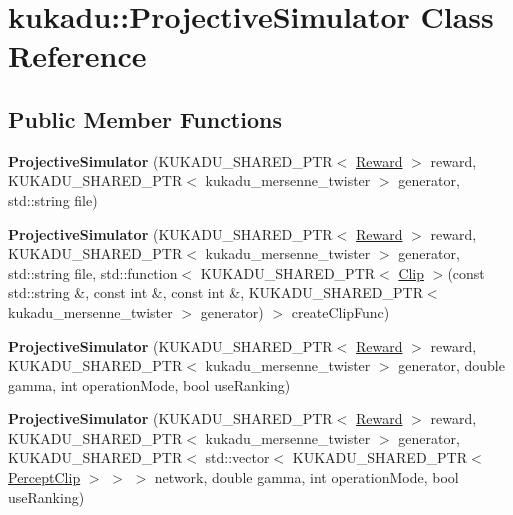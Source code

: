 \hypertarget{classkukadu_1_1ProjectiveSimulator}{}\section{kukadu\+:\+:Projective\+Simulator Class Reference}
\label{classkukadu_1_1ProjectiveSimulator}
\subsection*{Public Member Functions}
\begin{DoxyCompactItemize}
\item 
{\bfseries Projective\+Simulator} (K\+U\+K\+A\+D\+U\+\_\+\+S\+H\+A\+R\+E\+D\+\_\+\+P\+TR$<$ \hyperlink{classkukadu_1_1Reward}{Reward} $>$ reward, K\+U\+K\+A\+D\+U\+\_\+\+S\+H\+A\+R\+E\+D\+\_\+\+P\+TR$<$ kukadu\+\_\+mersenne\+\_\+twister $>$ generator, std\+::string file)\hypertarget{classkukadu_1_1ProjectiveSimulator_a5ab38c1c4ddc848435ef268154a68964}{}\label{classkukadu_1_1ProjectiveSimulator_a5ab38c1c4ddc848435ef268154a68964}

\item 
{\bfseries Projective\+Simulator} (K\+U\+K\+A\+D\+U\+\_\+\+S\+H\+A\+R\+E\+D\+\_\+\+P\+TR$<$ \hyperlink{classkukadu_1_1Reward}{Reward} $>$ reward, K\+U\+K\+A\+D\+U\+\_\+\+S\+H\+A\+R\+E\+D\+\_\+\+P\+TR$<$ kukadu\+\_\+mersenne\+\_\+twister $>$ generator, std\+::string file, std\+::function$<$ K\+U\+K\+A\+D\+U\+\_\+\+S\+H\+A\+R\+E\+D\+\_\+\+P\+TR$<$ \hyperlink{classkukadu_1_1Clip}{Clip} $>$(const std\+::string \&, const int \&, const int \&, K\+U\+K\+A\+D\+U\+\_\+\+S\+H\+A\+R\+E\+D\+\_\+\+P\+TR$<$ kukadu\+\_\+mersenne\+\_\+twister $>$ generator) $>$ create\+Clip\+Func)\hypertarget{classkukadu_1_1ProjectiveSimulator_af2a9a8b46a43939fc551c9a6d2ebac2d}{}\label{classkukadu_1_1ProjectiveSimulator_af2a9a8b46a43939fc551c9a6d2ebac2d}

\item 
{\bfseries Projective\+Simulator} (K\+U\+K\+A\+D\+U\+\_\+\+S\+H\+A\+R\+E\+D\+\_\+\+P\+TR$<$ \hyperlink{classkukadu_1_1Reward}{Reward} $>$ reward, K\+U\+K\+A\+D\+U\+\_\+\+S\+H\+A\+R\+E\+D\+\_\+\+P\+TR$<$ kukadu\+\_\+mersenne\+\_\+twister $>$ generator, double gamma, int operation\+Mode, bool use\+Ranking)\hypertarget{classkukadu_1_1ProjectiveSimulator_aa7f5285814bf9a4a630a8b3e62483cd3}{}\label{classkukadu_1_1ProjectiveSimulator_aa7f5285814bf9a4a630a8b3e62483cd3}

\item 
{\bfseries Projective\+Simulator} (K\+U\+K\+A\+D\+U\+\_\+\+S\+H\+A\+R\+E\+D\+\_\+\+P\+TR$<$ \hyperlink{classkukadu_1_1Reward}{Reward} $>$ reward, K\+U\+K\+A\+D\+U\+\_\+\+S\+H\+A\+R\+E\+D\+\_\+\+P\+TR$<$ kukadu\+\_\+mersenne\+\_\+twister $>$ generator, K\+U\+K\+A\+D\+U\+\_\+\+S\+H\+A\+R\+E\+D\+\_\+\+P\+TR$<$ std\+::vector$<$ K\+U\+K\+A\+D\+U\+\_\+\+S\+H\+A\+R\+E\+D\+\_\+\+P\+TR$<$ \hyperlink{classkukadu_1_1PerceptClip}{Percept\+Clip} $>$ $>$ $>$ network, double gamma, int operation\+Mode, bool use\+Ranking)\hypertarget{classkukadu_1_1ProjectiveSimulator_aa9bfdf6524f30d1f1e3e3c9c1094d59f}{}\label{classkukadu_1_1ProjectiveSimulator_aa9bfdf6524f30d1f1e3e3c9c1094d59f}


\end{DoxyCompactItemize}
